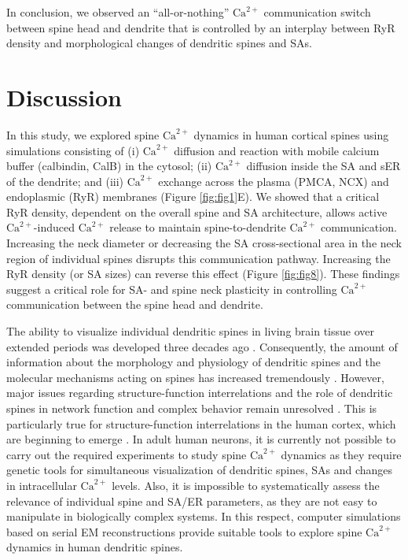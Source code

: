 \documentclass[12pt]{article}
\begin{document}
In conclusion, we observed an ``all-or-nothing'' $\textrm{Ca}^{2+}$ communication switch between spine head and dendrite that is controlled by an interplay between RyR density and morphological changes of dendritic spines and SAs. 


\section*{Discussion}
In this study, we explored spine $\textrm{Ca}^{2+}$ dynamics in human cortical spines using simulations consisting of (i) $\textrm{Ca}^{2+}$ diffusion and reaction with mobile calcium buffer (calbindin, CalB) in the cytosol; (ii) $\textrm{Ca}^{2+}$ diffusion inside the SA and sER of the dendrite; and (iii) $\textrm{Ca}^{2+}$ exchange across the plasma (PMCA, NCX) and endoplasmic (RyR) membranes (Figure \ref{fig:fig1}E). We showed that a critical RyR density, dependent on the overall spine and SA architecture, allows active $\textrm{Ca}^{2+}$-induced $\textrm{Ca}^{2+}$ release to maintain spine-to-dendrite $\textrm{Ca}^{2+}$ communication. Increasing the neck diameter or decreasing the SA cross-sectional area in the neck region of individual spines disrupts this communication pathway. Increasing the RyR density (or SA sizes) can reverse this effect (Figure \ref{fig:fig8}). These findings suggest a critical role for SA- and spine neck plasticity in controlling $\textrm{Ca}^{2+}$ communication between the spine head and dendrite.

The ability to visualize individual dendritic spines in living brain tissue over extended periods was developed three decades ago \cite{Guthrie1991, MullerConnor1991}. Consequently, the amount of information about the morphology and physiology of dendritic spines and the molecular mechanisms acting on spines has increased tremendously \cite{Svoboda1996,Sabatini2002,Holtmaat2005,Sala2014,Segal2017}. However, major issues regarding structure-function interrelations and the role of dendritic spines in network function and complex behavior remain unresolved \cite{Segal2017}. This is particularly true for structure-function interrelations in the human cortex, which are beginning to emerge \cite{Lenz2021}. In adult human neurons, it is currently not possible to carry out the required experiments to study spine $\textrm{Ca}^{2+}$ dynamics as they require genetic tools for simultaneous visualization of dendritic spines, SAs and changes in intracellular $\textrm{Ca}^{2+}$ levels. Also, it is impossible to systematically assess the relevance of individual spine and SA/ER parameters, as they are not easy to manipulate in biologically complex systems.  In this respect, computer simulations based on serial EM reconstructions provide suitable tools to explore spine $\textrm{Ca}^{2+}$ dynamics in human dendritic spines.
	
\end{document}
